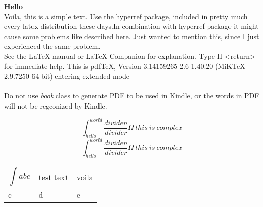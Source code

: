 \documentclass[fleqn]{minimal}
\def\chapter#1{\pdfbookmark{#1}{id:#1}\textbf{#1}\\}
\begin{document}
\chapter{Hello}
Voila, this is a simple text.
Use the hyperref package, included in pretty much every latex distribution these days.In combination with hyperref package it might cause some problems like described here. Just wanted to mention this, since I just experienced the same problem.\\
See the LaTeX manual or LaTeX Companion for explanation.
Type  H <return>  for immediate help.
This is pdfTeX, Version 3.14159265-2.6-1.40.20 (MiKTeX 2.9.7250 64-bit)
entering extended mode\\
\\%
Do not use \emph{book} class to generate PDF to be used in Kindle, or the words in PDF will not be regconized by Kindle.

\[ \int_{hello}^{world}\frac{dividen}{divider} \Omega~this~is~complex \]
\[ \int_{hello}^{world}\frac{dividen}{divider} \Omega~this~is~complex \]


\newlength\q
\setlength{}
\noindent\begin{tabular}{p{\q}p{\q}p{\q}}
\[\int abc\] & test text & voila\\
c & d & e
\end{tabular}
\end{document}
